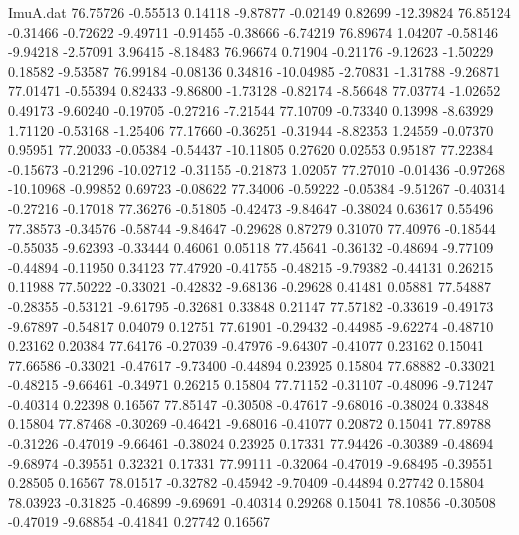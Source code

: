 \begin{filecontents}{ImuA.dat}
  76.75726   -0.55513    0.14118   -9.87877   -0.02149    0.82699  -12.39824
  76.85124   -0.31466   -0.72622   -9.49711   -0.91455   -0.38666   -6.74219
  76.89674    1.04207   -0.58146   -9.94218   -2.57091    3.96415   -8.18483
  76.96674    0.71904   -0.21176   -9.12623   -1.50229    0.18582   -9.53587
  76.99184   -0.08136    0.34816  -10.04985   -2.70831   -1.31788   -9.26871
  77.01471   -0.55394    0.82433   -9.86800   -1.73128   -0.82174   -8.56648
  77.03774   -1.02652    0.49173   -9.60240   -0.19705   -0.27216   -7.21544
  77.10709   -0.73340    0.13998   -8.63929    1.71120   -0.53168   -1.25406
  77.17660   -0.36251   -0.31944   -8.82353    1.24559   -0.07370    0.95951
  77.20033   -0.05384   -0.54437  -10.11805    0.27620    0.02553    0.95187
  77.22384   -0.15673   -0.21296  -10.02712   -0.31155   -0.21873    1.02057
  77.27010   -0.01436   -0.97268  -10.10968   -0.99852    0.69723   -0.08622
  77.34006   -0.59222   -0.05384   -9.51267   -0.40314   -0.27216   -0.17018
  77.36276   -0.51805   -0.42473   -9.84647   -0.38024    0.63617    0.55496
  77.38573   -0.34576   -0.58744   -9.84647   -0.29628    0.87279    0.31070
  77.40976   -0.18544   -0.55035   -9.62393   -0.33444    0.46061    0.05118
  77.45641   -0.36132   -0.48694   -9.77109   -0.44894   -0.11950    0.34123
  77.47920   -0.41755   -0.48215   -9.79382   -0.44131    0.26215    0.11988
  77.50222   -0.33021   -0.42832   -9.68136   -0.29628    0.41481    0.05881
  77.54887   -0.28355   -0.53121   -9.61795   -0.32681    0.33848    0.21147
  77.57182   -0.33619   -0.49173   -9.67897   -0.54817    0.04079    0.12751
  77.61901   -0.29432   -0.44985   -9.62274   -0.48710    0.23162    0.20384
  77.64176   -0.27039   -0.47976   -9.64307   -0.41077    0.23162    0.15041
  77.66586   -0.33021   -0.47617   -9.73400   -0.44894    0.23925    0.15804
  77.68882   -0.33021   -0.48215   -9.66461   -0.34971    0.26215    0.15804
  77.71152   -0.31107   -0.48096   -9.71247   -0.40314    0.22398    0.16567
  77.85147   -0.30508   -0.47617   -9.68016   -0.38024    0.33848    0.15804
  77.87468   -0.30269   -0.46421   -9.68016   -0.41077    0.20872    0.15041
  77.89788   -0.31226   -0.47019   -9.66461   -0.38024    0.23925    0.17331
  77.94426   -0.30389   -0.48694   -9.68974   -0.39551    0.32321    0.17331
  77.99111   -0.32064   -0.47019   -9.68495   -0.39551    0.28505    0.16567
  78.01517   -0.32782   -0.45942   -9.70409   -0.44894    0.27742    0.15804
  78.03923   -0.31825   -0.46899   -9.69691   -0.40314    0.29268    0.15041
  78.10856   -0.30508   -0.47019   -9.68854   -0.41841    0.27742    0.16567

\end{filecontents}
